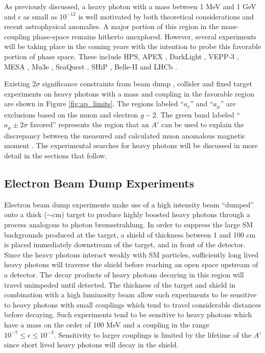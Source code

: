 As previously discussed, a heavy photon with a mass between 1 MeV and 1 GeV and
$\epsilon$ as small as $10^{-12}$ is well motivated by both theoretical
considerations and recent astrophysical anomalies.  A major portion of this
region in the mass-coupling phase-space remains hitherto unexplored. However,
several experiments will be taking place in the coming years with the intention
to probe this favorable portion of phase space. These include HPS, APEX \cite{Essig:2010xa}, 
DarkLight \cite{Freytsis:2009bh}, VEPP-3 \cite{Wojtsekhowski:2012zq},
MESA \cite{Beranek:2013yqa}, Mu3e \cite{Echenard:2014lma}, 
SeaQuest \cite{Gardner:2015wea}, SHiP \cite{Alekhin:2015byh}, Belle-II and 
LHCb \cite{Ilten:2016tkc, Ilten:2015hya}.

Existing $2\sigma$ significance constraints
from beam dump \cite{Bjorken:1988as, riordan1987, bross1991, konaka1986,
                     davier1989, Bjorken:2009mm, andreas2012, Blumlein:1990ay,
                     Blumlein:1991xh},  
collider \cite{Reece:2009un, Aubert:2009cp, Babusci:2012cr, Archilli:2011zc} 
and fixed target experiments \cite{Abrahamyan:2011gv, Merkel:2014avp,
                                   Agakishiev:2013fwl, Batley:2015lha}
on heavy photons with a mass and coupling in the favorable region are shown 
in Figure \ref{fig:ap_limits}. The regions labeled ``$a_e$'' and ``$a_\mu$'' 
are exclusions based on the muon and electron $g-2$.
The green band labeled ``$a_{\mu} \pm 2\sigma$ favored'' represents the region
that an $A'$ can be used to explain the discrepancy  between the measured and
calculated muon anomalous magnetic moment \cite{Pospelov:2008zw, Bennett:2006fi}.
The experimental searches for heavy photons will be discussed in more detail
in the sections that follow.

\subsection{Electron Beam Dump Experiments}

Electron beam dump experiments make use of a high intensity beam ``dumped'' onto
a thick ($\sim$cm) target to produce highly boosted heavy photons through a 
process analogous to photon bremsstrahlung.  In order to suppress the large
SM backgrounds produced at the target, a shield of thickness between 1 and 
100 cm
is placed immediately downstream of the target, and in front of the detector.  Since the 
heavy photons interact weakly with SM particles, sufficiently long lived 
heavy photons will traverse the shield before reaching an open space upstream
of a detector.  The decay products of heavy photons decaying in this region 
will travel unimpeded until detected.
The thickness of the target and shield in combination with a high luminosity
beam allow such experiments to be sensitive to heavy photons with small 
couplings which tend to travel considerable distances before decaying. Such 
experiments tend to be sensitive to heavy photons which have a mass on the order
of 100 MeV and a coupling in the range $10^{-7} \le \epsilon \le 10^{-3}$.  
Sensitivity to larger couplings is limited by the lifetime of the $A'$ since
short lived heavy photons will decay in the shield.

